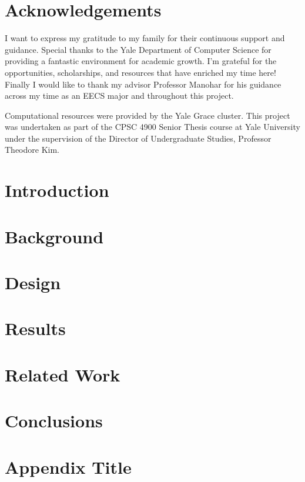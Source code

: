 \documentclass[12pt,twoside]{report}
\begin{document}


\chapter*{Acknowledgements}
I want to express my gratitude to my family for their continuous support and guidance. Special thanks to the Yale Department of Computer Science for providing a fantastic environment for academic growth. I'm grateful for the opportunities, scholarships, and resources that have enriched my time here! Finally I would like to thank my advisor Professor Manohar for his guidance across my time as an EECS major and throughout this project. 

Computational
resources were provided by the Yale Grace cluster. This
project was undertaken as part of the CPSC 4900 Senior Thesis course at Yale University under the supervision of
the Director of Undergraduate Studies, Professor Theodore
Kim.

{
  \hypersetup{linkcolor=black}
  \tableofcontents
}

\clearpage




\chapter{Introduction}


\chapter{Background} \label{ch:background}


\chapter{Design} \label{ch:methodology}



\chapter{Results} \label{ch:results}


\chapter{Related Work} \label{ch:relatedwork}


\chapter{Conclusions} \label{ch:conclusion}


% 


\printbibliography

\appendix
\chapter{Appendix Title} \label{ch:appendices}
 
\end{document}
